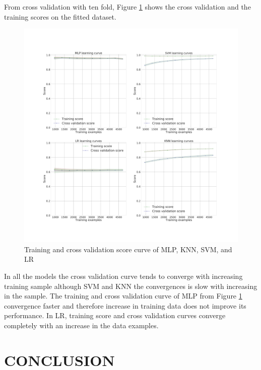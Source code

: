 \documentclass[final,5p,times,twocolumn,authoryear]{elsarticle}
\begin{document}
From cross validation with ten fold, Figure \ref{fig:crossval} shows the cross validation and the training scores on the fitted dataset.
\begin{figure}[H]
	\centering
	\includegraphics[width=1.1\linewidth]{Figures/bias}
	\caption{Training and cross validation score curve of MLP, KNN, SVM, and LR}
		\label{fig:crossval}
\end{figure}
 In all the models the cross validation curve tends to converge with increasing training sample although SVM  and KNN the convergences is slow with increasing in the sample.  The training and cross validation curve of MLP from Figure \ref{fig:crossval} convergence faster and therefore increase in training data does not improve its performance. In LR, training score and cross validation curves converge completely with an increase in the data examples.
 
\section{CONCLUSION}
\end{document}
